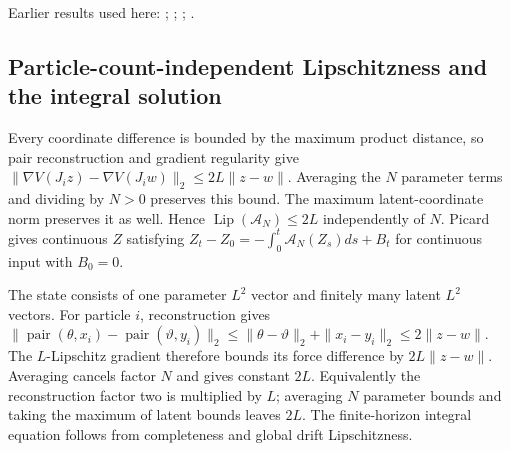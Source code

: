 \documentclass[11pt,a4paper]{report}
\begin{document}
Earlier results used here: \cite[Section~3.13.2]{LangevinLean2026ULASC}; \cite[Section~3.13.3]{LangevinLean2026ULASC}; \cite[Section~3.1.1]{LangevinLean2026IPLA}; \cite[Section~3.3.1]{LangevinLean2026IPLA}.
\subsection{\texorpdfstring{Particle-count-independent Lipschitzness and the integral solution}{Particle-count-independent Lipschitzness and the integral solution}}
\label{report-step-ProximalLangevin-MeanFieldParticleDrift-lean-4}


Every coordinate difference is bounded by the maximum product distance, so pair reconstruction and gradient regularity give \(\|\nabla V(J_i z)-\nabla V(J_i w)\|_2\le2L\|z-w\|\). Averaging the \(N\) parameter terms and dividing by \(N>0\) preserves this bound. The maximum latent-coordinate norm preserves it as well. Hence \(\operatorname{Lip}(\mathcal A_N)\le2L\) independently of \(N\). Picard gives continuous \(Z\) satisfying \(Z_t-Z_0=-\int_0^t\mathcal A_N(Z_s)ds+B_t\) for continuous input with \(B_0=0\).



The state consists of one parameter \(L^2\) vector and finitely many latent \(L^2\) vectors. For particle \(i\), reconstruction gives \(\|\operatorname{pair}(\theta,x_i)-\operatorname{pair}(\vartheta,y_i)\|_2\le\|\theta-\vartheta\|_2+\|x_i-y_i\|_2\le2\|z-w\|\). The \(L\)-Lipschitz gradient therefore bounds its force difference by \(2L\|z-w\|\). Averaging cancels factor \(N\) and gives constant \(2L\). Equivalently the reconstruction factor two is multiplied by \(L\); averaging \(N\) parameter bounds and taking the maximum of latent bounds leaves \(2L\). The finite-horizon integral equation follows from completeness and global drift Lipschitzness.
\end{document}
